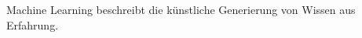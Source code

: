 \documentclass[preview]{standalone}
\begin{document}
\begin{center}
Machine Learning beschreibt die künstliche Generierung von Wissen aus Erfahrung.
\end{center}
\end{document}
